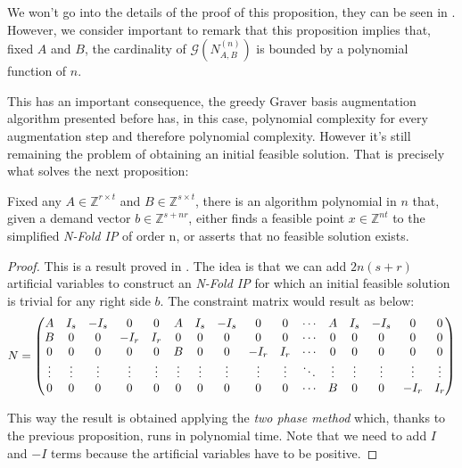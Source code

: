 We won't go into the details of the proof of this proposition, they can be seen in \cite[Theorem 4.2]{LHOW:2006}. However, we consider important to remark that this proposition implies that, fixed $A$ and $B$, the cardinality of $\mathcal{G}(N_{A,B}^{(n)})$ is bounded by a polynomial function of $n$.

This has an important consequence, the greedy Graver basis augmentation algorithm presented before has, in this case, polynomial complexity for every augmentation step and therefore polynomial complexity. However it's still remaining the problem of obtaining an initial feasible solution. That is precisely what solves the next proposition:

\begin{lemma} \label{Nfold_two_phase}
Fixed any $A \in \mathbb{Z}^{r \times t}$ and $B \in \mathbb{Z}^{s \times t}$, there is an algorithm polynomial in $n$ that, given a  demand vector $b \in \mathbb{Z}^{s + nr}$, either finds a feasible point $x \in \mathbb{Z}^{nt}$ to the simplified \emph{N-Fold IP} of order n, or asserts that no feasible solution exists.
\end{lemma}
\vspace{-15pt} 
\begin{proof}
This is a result proved in \cite[Lemma 5.2]{LHOW:2006}. The idea is that we can add $2n(s+r)$ artificial variables to construct an \emph{N-Fold IP} for which an initial feasible solution is trivial for any right side $b$. The constraint matrix would result as below: 
\vspace{5pt}
\begin{equation*}
N = 
\setcounter{MaxMatrixCols}{20}
\begin{pmatrix}
A & I_s & -I_s & 0 & 0 & A & I_s & -I_s & 0 & 0 & \cdots & A & I_s & -I_s & 0 & 0 \\
B & 0 & 0 & -I_r & I_r & 0 & 0 & 0 & 0 & 0 & \cdots & 0 & 0 & 0 & 0 & 0 \\
0 & 0 & 0 & 0 & 0 & B & 0 & 0 & -I_r & I_r & \cdots & 0 & 0 & 0 & 0 & 0 \\
\vdots & \vdots & \vdots & \vdots & \vdots & \vdots & \vdots & \vdots & \vdots & \vdots & \ddots & \vdots & \vdots  & \vdots & \vdots & \vdots \\
0 & 0 & 0 & 0 & 0 & 0 & 0 & 0 & 0 & 0 & \cdots & B & 0 & 0 & -I_r & I_r 
\end{pmatrix}
\end{equation*}

This way the result is obtained applying the \textit{two phase method} which, thanks to the previous proposition, runs in polynomial time. Note that we need to add $I$ and $-I$ terms because the artificial variables have to be positive.
\vspace{5pt}
\end{proof}

